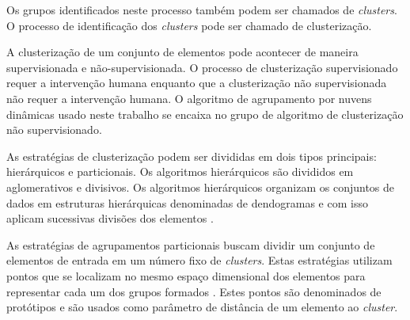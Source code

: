 
Os grupos identificados neste processo também podem ser chamados de \emph{clusters}. O processo de identificação dos \emph{clusters} pode ser chamado de clusterização.

A clusterização de um conjunto de elementos pode acontecer de maneira supervisionada e não-supervisionada. O processo de clusterização supervisionado requer a intervenção humana enquanto que a clusterização não supervisionada não requer a intervenção humana. O algoritmo de agrupamento por nuvens dinâmicas usado neste trabalho se encaixa no grupo de algoritmo de clusterização não supervisionado.

As estratégias de clusterização podem ser divididas em dois tipos principais: hierárquicos e particionais. Os algoritmos hierárquicos são divididos em aglomerativos e divisivos. Os algoritmos hierárquicos organizam os conjuntos de dados em estruturas hierárquicas denominadas de dendogramas e com isso aplicam sucessivas divisões dos elementos \cite{leandro}.

As estratégias de agrupamentos particionais buscam dividir um conjunto de elementos de entrada em um número fixo de \emph{clusters}. Estas estratégias utilizam pontos que se localizam no mesmo espaço dimensional dos elementos para representar cada um dos grupos formados \cite{leandro}. Estes pontos são denominados de protótipos e são usados como parâmetro de distância de um elemento ao \emph{cluster}.

